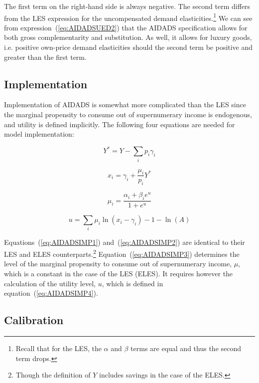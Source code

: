 The first term on the right-hand side is always negative. The second term differs from the LES
expression for the uncompensated demand elasticities.\footnote{Recall that for the LES, the
$\alpha$ and $\beta$ terms are equal and thus the second term drops.}  We can see from
expression~(\ref{eq:AIDADSUED2}) that the AIDADS specification allows for both gross
complementarity and substitution. As well, it allows for luxury goods, i.e. positive own-price
demand elasticities should the second term be positive and greater than the first term.

\subsection{Implementation}

Implementation of AIDADS is somewhat more complicated than the LES since the marginal propensity to
 consume out of supernumerary income is endogenous, and utility is defined implicitly.
The following four equations are needed for model implementation:

\begin{equation}
\label{eq:AIDADSIMP1}
{Y^*} = Y - \sum\limits_i {{p_i}{\gamma _i}}
\end{equation}

\begin{equation}
\label{eq:AIDADSIMP2}
{x_i} = {\gamma _i} + \frac{{{\mu _i}}}{{{p_i}}}{Y^*}
\end{equation}

\begin{equation}
\label{eq:AIDADSIMP3}
{\mu _i} = \frac{{{\alpha _i} + {\beta _i}{e^u}}}{{1 + {e^u}}}
\end{equation}

\begin{equation}
\label{eq:AIDADSIMP4}
u = \sum\limits_i {{\mu _i}\ln \left( {{x_i} - {\gamma _i}} \right)}  - 1 - \ln \left( A \right)
\end{equation}

Equations~(\ref{eq:AIDADSIMP1}) and~(\ref{eq:AIDADSIMP2}) are identical to their LES and ELES
counterparts.\footnote{Though the definition of $Y$ includes
savings in the case of the ELES.}
Equation~(\ref{eq:AIDADSIMP3}) determines the level of the marginal propensity to
consume out of supernumerary income, $\mu$, which is a constant in the case of the LES (ELES).
It requires however the calculation of the utility level, $u$, which is defined in
equation~(\ref{eq:AIDADSIMP4}).

\subsection{Calibration}

